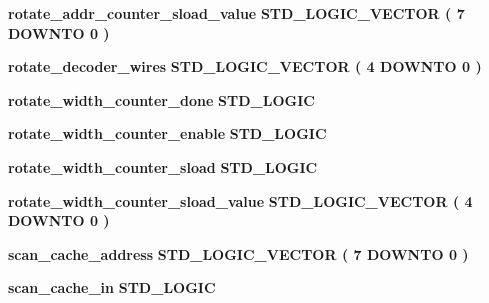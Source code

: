 \begin{DoxyCompactItemize}
{\bf rotate\+\_\+addr\+\_\+counter\+\_\+sload\+\_\+value} {\bfseries \textcolor{comment}{S\+T\+D\+\_\+\+L\+O\+G\+I\+C\+\_\+\+V\+E\+C\+T\+OR}\textcolor{vhdlchar}{ }\textcolor{vhdlchar}{(}\textcolor{vhdlchar}{ }\textcolor{vhdlchar}{ } \textcolor{vhdldigit}{7} \textcolor{vhdlchar}{ }\textcolor{keywordflow}{D\+O\+W\+N\+TO}\textcolor{vhdlchar}{ }\textcolor{vhdlchar}{ } \textcolor{vhdldigit}{0} \textcolor{vhdlchar}{ }\textcolor{vhdlchar}{)}\textcolor{vhdlchar}{ }} 
\item 
{\bf rotate\+\_\+decoder\+\_\+wires} {\bfseries \textcolor{comment}{S\+T\+D\+\_\+\+L\+O\+G\+I\+C\+\_\+\+V\+E\+C\+T\+OR}\textcolor{vhdlchar}{ }\textcolor{vhdlchar}{(}\textcolor{vhdlchar}{ }\textcolor{vhdlchar}{ } \textcolor{vhdldigit}{4} \textcolor{vhdlchar}{ }\textcolor{keywordflow}{D\+O\+W\+N\+TO}\textcolor{vhdlchar}{ }\textcolor{vhdlchar}{ } \textcolor{vhdldigit}{0} \textcolor{vhdlchar}{ }\textcolor{vhdlchar}{)}\textcolor{vhdlchar}{ }} 
\item 
{\bf rotate\+\_\+width\+\_\+counter\+\_\+done} {\bfseries \textcolor{comment}{S\+T\+D\+\_\+\+L\+O\+G\+IC}\textcolor{vhdlchar}{ }} 
\item 
{\bf rotate\+\_\+width\+\_\+counter\+\_\+enable} {\bfseries \textcolor{comment}{S\+T\+D\+\_\+\+L\+O\+G\+IC}\textcolor{vhdlchar}{ }} 
\item 
{\bf rotate\+\_\+width\+\_\+counter\+\_\+sload} {\bfseries \textcolor{comment}{S\+T\+D\+\_\+\+L\+O\+G\+IC}\textcolor{vhdlchar}{ }} 
\item 
{\bf rotate\+\_\+width\+\_\+counter\+\_\+sload\+\_\+value} {\bfseries \textcolor{comment}{S\+T\+D\+\_\+\+L\+O\+G\+I\+C\+\_\+\+V\+E\+C\+T\+OR}\textcolor{vhdlchar}{ }\textcolor{vhdlchar}{(}\textcolor{vhdlchar}{ }\textcolor{vhdlchar}{ } \textcolor{vhdldigit}{4} \textcolor{vhdlchar}{ }\textcolor{keywordflow}{D\+O\+W\+N\+TO}\textcolor{vhdlchar}{ }\textcolor{vhdlchar}{ } \textcolor{vhdldigit}{0} \textcolor{vhdlchar}{ }\textcolor{vhdlchar}{)}\textcolor{vhdlchar}{ }} 
\item 
{\bf scan\+\_\+cache\+\_\+address} {\bfseries \textcolor{comment}{S\+T\+D\+\_\+\+L\+O\+G\+I\+C\+\_\+\+V\+E\+C\+T\+OR}\textcolor{vhdlchar}{ }\textcolor{vhdlchar}{(}\textcolor{vhdlchar}{ }\textcolor{vhdlchar}{ } \textcolor{vhdldigit}{7} \textcolor{vhdlchar}{ }\textcolor{keywordflow}{D\+O\+W\+N\+TO}\textcolor{vhdlchar}{ }\textcolor{vhdlchar}{ } \textcolor{vhdldigit}{0} \textcolor{vhdlchar}{ }\textcolor{vhdlchar}{)}\textcolor{vhdlchar}{ }} 
\item 
{\bf scan\+\_\+cache\+\_\+in} {\bfseries \textcolor{comment}{S\+T\+D\+\_\+\+L\+O\+G\+IC}\textcolor{vhdlchar}{ }} 

\end{DoxyCompactItemize}
